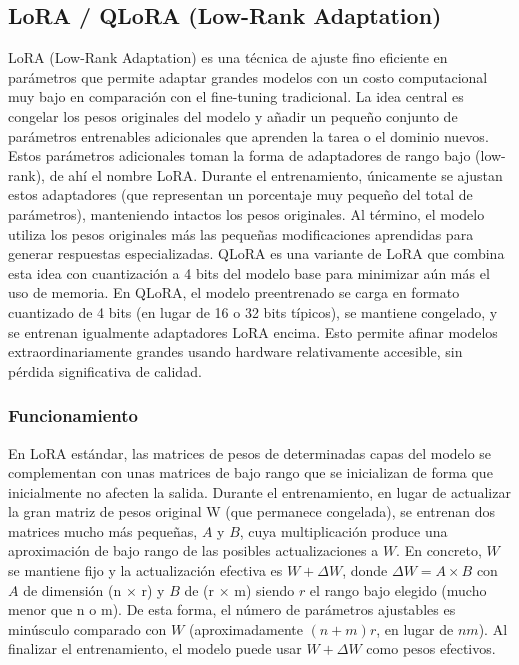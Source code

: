 \subsection{LoRA / QLoRA (Low-Rank Adaptation)}

LoRA (Low-Rank Adaptation) es una técnica de ajuste fino eficiente en parámetros que permite adaptar grandes modelos con un costo computacional muy bajo en comparación con el fine-tuning tradicional. La idea central es congelar los pesos originales del modelo y añadir un pequeño conjunto de parámetros entrenables adicionales que aprenden la tarea o el dominio nuevos. Estos parámetros adicionales toman la forma de adaptadores de rango bajo (low-rank), de ahí el nombre LoRA. Durante el entrenamiento, únicamente se ajustan estos adaptadores (que representan un porcentaje muy pequeño del total de parámetros), manteniendo intactos los pesos originales. Al término, el modelo utiliza los pesos originales más las pequeñas modificaciones aprendidas para generar respuestas especializadas. QLoRA es una variante de LoRA que combina esta idea con cuantización a 4 bits del modelo base para minimizar aún más el uso de memoria. En QLoRA, el modelo preentrenado se carga en formato cuantizado de 4 bits (en lugar de 16 o 32 bits típicos), se mantiene congelado, y se entrenan igualmente adaptadores LoRA encima. Esto permite afinar modelos extraordinariamente grandes usando hardware relativamente accesible, sin pérdida significativa de calidad.\cite{CloudFlare-LoRA}

\subsubsection{Funcionamiento}

En LoRA estándar, las matrices de pesos de determinadas capas del modelo  se complementan con unas matrices de bajo rango que se inicializan de forma que inicialmente no afecten la salida. Durante el entrenamiento, en lugar de actualizar la gran matriz de pesos original W (que permanece congelada), se entrenan dos matrices mucho más pequeñas, $A$ y $B$, cuya multiplicación produce una aproximación de bajo rango de las posibles actualizaciones a $W$. En concreto, $W$ se mantiene fijo y la actualización efectiva es $W + \Delta W$, donde $\Delta W = A \times B$ con $A$ de dimensión (n × r) y $B$ de (r × m) siendo $r$ el rango bajo elegido (mucho menor que n o m). De esta forma, el número de parámetros ajustables es minúsculo comparado con $W$ (aproximadamente $(n+m)r$, en lugar de $nm$). Al finalizar el entrenamiento, el modelo puede usar $W + \Delta W$ como pesos efectivos.\cite{CloudFlare-LoRA}

